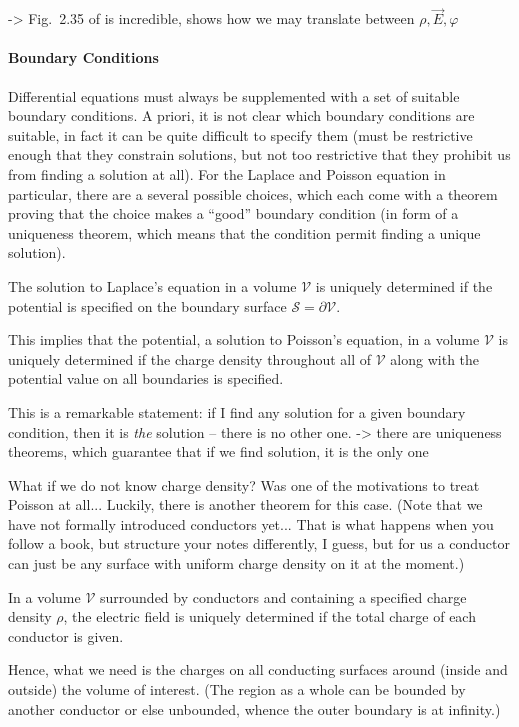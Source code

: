 \documentclass[../class_mech_main.tex]{subfiles}
\begin{document}
-> Fig.~2.35 of \cite{Griffiths_2017} is incredible, shows how we may translate between $\rho, \vec{E}, \varphi$



            \paragraph{Boundary Conditions}
Differential equations must always be supplemented with a set of suitable boundary conditions. A priori, it is not clear which boundary conditions are suitable, in fact it can be quite difficult to specify them (must be restrictive enough that they constrain solutions, but not too restrictive that they prohibit us from finding a solution at all). For the Laplace and Poisson equation in particular, there are a several possible choices, which each come with a theorem proving that the choice makes a \enquote{good} boundary condition (in form of a uniqueness theorem, which means that the condition permit finding a unique solution).


\begin{thm}\label{thm:uniqueness_poisson_1}
    The solution to Laplace's equation in a volume $\mathcal{V}$ is uniquely determined if the potential is specified on the boundary surface $\mathcal{S} = \partial \mathcal{V}$.

    This implies that the potential, a solution to Poisson's equation, in a volume $\mathcal{V}$ is uniquely determined if the charge density throughout all of $\mathcal{V}$ along with the potential value on all boundaries is specified.
\end{thm}
This is a remarkable statement: if I find any solution for a given boundary condition, then it is \emph{the} solution -- there is no other one.
-> there are uniqueness theorems, which guarantee that if we find solution, it is the only one


What if we do not know charge density? Was one of the motivations to treat Poisson at all... Luckily, there is another theorem for this case. (Note that we have not formally introduced conductors yet... That is what happens when you follow a book, but structure your notes differently, I guess, but for us a conductor can just be any surface with uniform charge density on it at the moment.)

\begin{thm}\label{thm:uniqueness_poisson_2}
    In a volume $\mathcal{V}$ surrounded by conductors and containing a specified charge density $\rho$, the electric field is uniquely determined if the total charge of each conductor is given.
\end{thm}
Hence, what we need is the charges on all conducting surfaces around (inside and outside) the volume of interest. (The region as a whole can be bounded by another conductor or else unbounded, whence the outer boundary is at infinity.)
\end{document}

